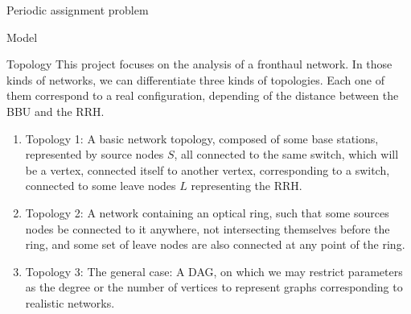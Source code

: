 \documentclass[a4paper,10pt]{report}
\begin{document}
\begin{chapter}{Periodic assignment problem}
\begin{section}{Model}
\begin{subsection}{Topology}
This project focuses on the analysis of a fronthaul network. In those kinds of networks, we can differentiate three kinds of
topologies. Each one of them correspond to a real configuration, depending of the distance between the BBU and the RRH.
\begin{enumerate}
 \item Topology 1: A basic network topology, composed of some base stations, represented by source nodes $S$, all connected to the same switch,
which will be a vertex, connected itself to another vertex, corresponding to a switch, connected to some leave nodes $L$ representing the RRH.
\item Topology 2: A network containing an optical ring, such that some sources nodes be connected to it anywhere, not intersecting themselves before the ring,
and some set of leave nodes are also connected at any point of the ring.
\item Topology 3: The general case: A DAG, on which we may restrict parameters as the degree or the number of vertices to represent graphs corresponding to realistic networks.
\end{enumerate}
\\


\end{subsection}
\end{section}
\end{chapter}
\end{document}
